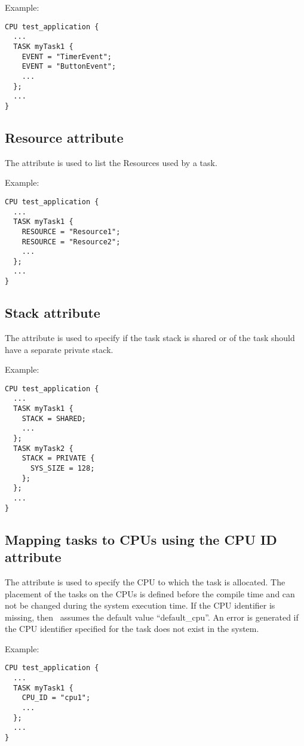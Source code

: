Example:

\begin{lstlisting}
CPU test_application {
  ...
  TASK myTask1 {
    EVENT = "TimerEvent";
    EVENT = "ButtonEvent";
    ...
  };
  ...
}
\end{lstlisting}

\subsection{Resource attribute}
The  attribute is used to list the
Resources used by a task.

Example:

\begin{lstlisting}
CPU test_application {
  ...
  TASK myTask1 {
    RESOURCE = "Resource1";
    RESOURCE = "Resource2";
    ...
  };
  ...
}
\end{lstlisting}

\subsection{Stack attribute}
The  attribute is used to specify if the task stack is shared or of the task should have a separate private stack.

Example:

\begin{lstlisting}
CPU test_application {
  ...
  TASK myTask1 {
    STACK = SHARED;
    ...
  };
  TASK myTask2 {
    STACK = PRIVATE {
      SYS_SIZE = 128;
    };
  };
  ...
}
\end{lstlisting}

\subsection{Mapping tasks to CPUs using the CPU ID attribute}
\label{sub:task-mapping-to-cpu}

The  attribute is used to specify the CPU
to which the task is allocated. The placement of the tasks on the CPUs
is defined before the compile time and can not be changed during the
system execution time. If the CPU identifier is missing, then \rtd\
assumes the default value ``default\_cpu''. An error is generated if
the CPU identifier specified for the task does not exist in the
system.

Example:

\begin{lstlisting}
CPU test_application {
  ...
  TASK myTask1 {
    CPU_ID = "cpu1";
    ...
  };
  ...
}
\end{lstlisting}



